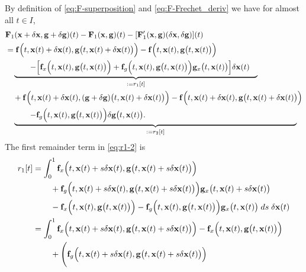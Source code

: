 \documentclass[onefignum,onetabnum]{siamart220329}
\numberwithin{equation}{section}
\newcommand{\bff}{\ensuremath{\mathbf{f}}} %
\newcommand{\bg}{\ensuremath{\mathbf{g}}} %
\newcommand{\bx}{\ensuremath{\mathbf{x}}} %
\newcommand{\BF}{\ensuremath{\mathbf{F}} } %
\begin{document}
\begin{appendix}
    
    By definition of \cref{eq:F-superposition} and \cref{eq:F-Frechet_deriv} we have for  almost all $t \in I$,
    \begin{align}  \label{eq:r1-2}
       & \BF_1(\bx+\delta \bx, \bg + \delta \bg)(t)  - \BF_1(\bx, \bg)(t)  - [\BF_1'(\bx, \bg) (\delta \bx, \delta \bg)](t)   \nonumber \\
       &=\bff\Big( t, \bx(t) + \delta \bx(t), \bg\big(t, \bx(t) + \delta \bx(t) \big) \Big) 
                         -  \bff\Big( t, \bx(t), \bg\big(t, \bx(t) \big) \Big)        \nonumber \\
       &\quad \underbrace{ \qquad  -  \Big[ \bff_x\Big( t, \bx(t), \bg\big(t, \bx(t) \big) \Big) + \bff_g\Big( t, \bx(t), \bg\big(t, \bx(t) \big) \Big) \bg_x\big(t, \bx(t) \big) \Big] \delta \bx(t)  \quad }_{ := r_1[t]}      \\
       &\quad  + \bff\Big( t, \bx(t) + \delta \bx(t), (\bg + \delta \bg)\big(t, \bx(t) + \delta \bx(t) \big) \Big) 
                      -    \bff\Big( t, \bx(t) + \delta \bx(t), \bg\big(t, \bx(t) + \delta \bx(t) \big) \Big)             \nonumber \\
        & \quad \underbrace{ \qquad    - \bff_g\Big( t, \bx(t), \bg\big( t, \bx(t) \big) \Big) \delta \bg \big(t,  \bx(t) \big). \hspace*{40ex} \qquad }_{:= r_2[t]}   \nonumber 
    \end{align}
    The first remainder term in \cref{eq:r1-2} is
    \begin{align}
        r_1[t]
        &= \int_0^1 \bff_x\Big( t, \bx(t) + s \delta \bx(t), \bg\big(t, \bx(t) + s \delta \bx(t) \big) \Big)  \nonumber  \\
         &\hspace*{5ex} + \bff_g\Big( t, \bx(t) + s \delta \bx(t), \bg\big(t, \bx(t) + s \delta \bx(t) \big) \Big)  \bg_x\big(t, \bx(t) + s \delta \bx(t) \big)  \nonumber  \\
         &\hspace*{5ex}  -  \bff_x\Big( t, \bx(t), \bg\big(t, \bx(t) \big) \Big) 
                          -  \bff_g\Big( t, \bx(t), \bg\big(t, \bx(t) \big) \Big) \bg_x\big(t, \bx(t) \big)  \; ds \; \delta \bx(t)   \nonumber  \\
        &= \int_0^1  \bff_x\Big( t, \bx(t) + s \delta \bx(t), \bg\big(t, \bx(t) + s \delta \bx(t) \big) \Big) 
                                   -  \bff_x\Big( t, \bx(t), \bg\big(t, \bx(t) \big) \Big)  \nonumber  \\
        &\hspace*{5ex}      + \Bigg( \bff_g\Big( t, \bx(t) + s \delta \bx(t), \bg\big(t, \bx(t) + s \delta \bx(t) \big) \Big) 

\end{align}
\end{appendix}
\end{document}
